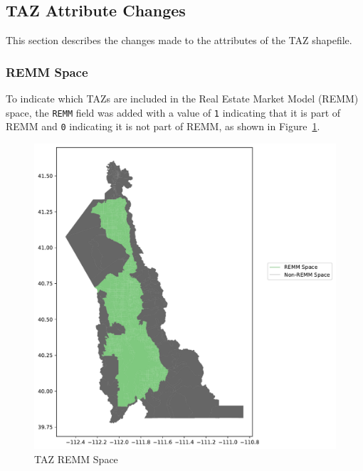 \documentclass[
  letterpaper,
  DIV=11,
  numbers=noendperiod,
  titlepage=false]{scrreprt}
\begin{document}
\hypertarget{taz-attribute-changes}{%
\subsection{TAZ Attribute Changes}\label{taz-attribute-changes}}

This section describes the changes made to the attributes of the TAZ
shapefile.

\hypertarget{remm-space}{%
\subsubsection{REMM Space}\label{remm-space}}

To indicate which TAZs are included in the Real Estate Market Model
(REMM) space, the \texttt{REMM} field was added with a value of
\texttt{1} indicating that it is part of REMM and \texttt{0} indicating
it is not part of REMM, as shown in Figure~\ref{fig-taz-remm-space-pdf}.

\begin{figure}[H]

{\centering \includegraphics{v9x/v900/whats-new/2-inputdata_files/figure-pdf/fig-taz-remm-space-pdf-output-1.pdf}

}

\caption{\label{fig-taz-remm-space-pdf}TAZ REMM Space}

\end{figure}
\end{document}
